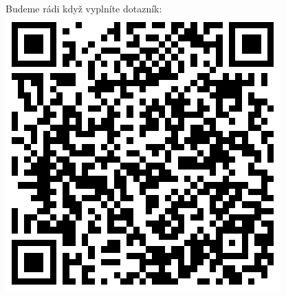 \documentclass[12pt]{article}
\begin{document}
Budeme rádi když vyplníte dotazník:\\
\includegraphics{../../../propagace/qrcodes/dotaznik.png}
\\

\vspace*{\fill}
\end{document}
